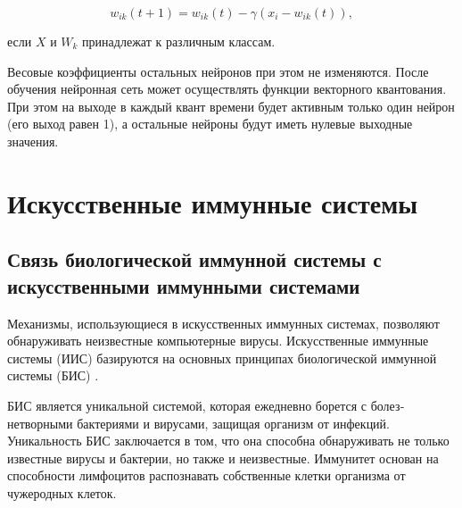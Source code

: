 \documentclass[bachelor, och, referat]{template}
\begin{document}
\begin{equation*}
    w_{ik}(t + 1) = w_{ik}(t) - \gamma(x_i - w_{ik}(t)),
\end{equation*}

если $X$ и $W_k$ принадлежат к различным классам.

Весовые коэффициенты остальных нейронов при этом не изменяются. 
После обучения нейронная сеть может осуществлять функции
векторного квантования. При этом на выходе в каждый квант времени
будет активным только один нейрон (его выход равен 1), а остальные
нейроны будут иметь нулевые выходные значения.


\section{Искусственные иммунные системы} 
\subsection{Связь биологической иммунной системы с искусственными иммунными системами}

Механизмы, использующиеся в ис­кусственных иммунных системах, позволяют обнаруживать неизвестные
компьютерные вирусы. Искусственные иммунные системы (ИИС) 
базируются на основных принципах биологической иммунной системы (БИС) \cite{ais1}.

БИС является уникальной системой, которая ежедневно борется с болез­нетворными 
бактериями и вирусами, защищая организм от инфекций.
Уникальность БИС заключается в том, что она способна обнаруживать не
только известные вирусы и бактерии, но также и неизвестные. Иммунитет
основан на способности лимфоцитов распознавать собственные клетки
организма от чужеродных клеток.
\end{document}
